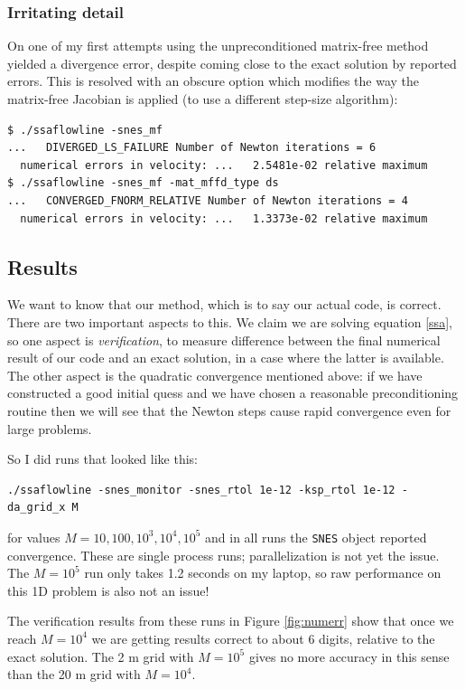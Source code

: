 \documentclass[11pt,final,reqno]{amsart}
\begin{document}
\subsubsection*{Irritating detail}  On one of my first attempts using the unpreconditioned matrix-free method yielded a divergence error, despite coming close to the exact solution by reported errors.  This is resolved with an obscure option which modifies the way the matrix-free Jacobian is applied (to use a different step-size algorithm):
\begin{Verbatim}[fontsize=\small]
$ ./ssaflowline -snes_mf
...   DIVERGED_LS_FAILURE Number of Newton iterations = 6
  numerical errors in velocity: ...   2.5481e-02 relative maximum
$ ./ssaflowline -snes_mf -mat_mffd_type ds
...   CONVERGED_FNORM_RELATIVE Number of Newton iterations = 4
  numerical errors in velocity: ...   1.3373e-02 relative maximum
\end{Verbatim}


\subsection*{Results}  We want to know that our method, which is to say our actual code, is correct.  There are two important aspects to this.  We claim we are solving equation \eqref{ssa}, so one aspect is \emph{verification}, to measure difference between the final numerical result of our code and an exact solution, in a case where the latter is available.  The other aspect is the quadratic convergence mentioned above: if we have constructed a good initial quess and we have chosen a reasonable preconditioning routine then we will see that the Newton steps cause rapid convergence even for large problems.

So I did runs that looked like this:
\begin{Verbatim}
./ssaflowline -snes_monitor -snes_rtol 1e-12 -ksp_rtol 1e-12 -da_grid_x M
\end{Verbatim}
for values $M=10,100,10^3,10^4,10^5$ and in all runs the \texttt{SNES} object reported convergence.  These are single process runs; parallelization is not yet the issue.  The $M=10^5$ run only takes 1.2 seconds on my laptop, so raw performance on this 1D problem is also not an issue!

The verification results from these runs in Figure \ref{fig:numerr} show that once we reach $M=10^4$ we are getting results correct to about 6 digits, relative to the exact solution.  The 2 m grid with $M=10^5$ gives no more accuracy in this sense than the 20 m grid with $M=10^4$.
\end{document}
